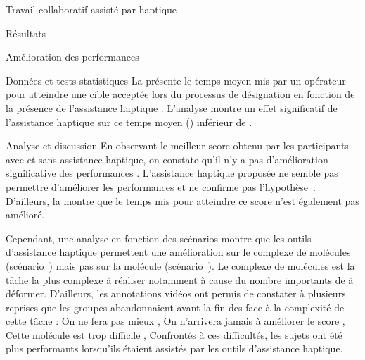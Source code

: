 \documentclass[myfrancais,ngerman,english,french]{mythesis}
\begin{document}
\begin{mychapter}{Travail collaboratif assisté par haptique}
\begin{mysection}{Résultats}
\begin{mysubsection}{Amélioration des performances}
\begin{mysubsubsection}{Données et tests statistiques}
					La  présente le temps moyen mis par un opérateur pour atteindre une cible acceptée lors du processus de désignation  en fonction de la présence de l'assistance haptique .
					L'analyse montre un effet significatif de l'assistance haptique  sur ce temps moyen  () inférieur de .
				\end{mysubsubsection}
				\begin{mysubsubsection}{Analyse et discussion}
					En observant le meilleur score  obtenu par les participants avec et sans assistance haptique, on constate qu'il n'y a pas d'amélioration significative des performances .
					L'assistance haptique proposée ne semble pas permettre d'améliorer les performances et ne confirme pas l'hypothèse~.
					D'ailleurs, la  montre que le temps mis pour atteindre ce score n'est également pas amélioré.

					Cependant, une analyse en fonction des scénarios montre que les outils d'assistance haptique permettent une amélioration sur le complexe de molécules \myNusENusG (scénario~) mais pas sur la molécule \myUbiquitin (scénario~).
					Le complexe de molécules \myNusENusG est la tâche la plus complexe à réaliser notamment à cause du nombre importants de  à déformer.
					D'ailleurs, les annotations vidéos ont permis de constater à plusieurs reprises que les groupes abandonnaient avant la fin des  face à la complexité de cette tâche : \og On ne fera pas mieux \fg, \og On n'arrivera jamais à améliorer le score \fg, \og Cette molécule est trop difficile \fg, \myetc
					Confrontés à ces difficultés, les sujets ont été plus performants lorsqu'ils étaient assistés par les outils d'assistance haptique.


\end{mysubsubsection}
\end{mysubsection}
\end{mysection}
\end{mychapter}
\end{document}
